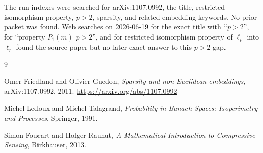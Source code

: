 \documentclass[11pt]{article}
\begin{document}
The run indexes were searched for arXiv:1107.0992, the title, restricted
isomorphism property, \(p>2\), sparsity, and related embedding keywords.  No
prior packet was found.  Web searches on 2026-06-19 for the exact title with
``\(p>2\)'', for ``property \(P_1(m)\) \(p>2\)'', and for restricted
isomorphism property of \(\ell_p\) into \(\ell_r\) found the source paper but
no later exact answer to this \(p>2\) gap.

\begin{thebibliography}{9}

Omer Friedland and Olivier Guedon,
\emph{Sparsity and non-Euclidean embeddings},
arXiv:1107.0992, 2011.
\url{https://arxiv.org/abs/1107.0992}

Michel Ledoux and Michel Talagrand,
\emph{Probability in Banach Spaces: Isoperimetry and Processes},
Springer, 1991.

Simon Foucart and Holger Rauhut,
\emph{A Mathematical Introduction to Compressive Sensing},
Birkhauser, 2013.

\end{thebibliography}
\end{document}
